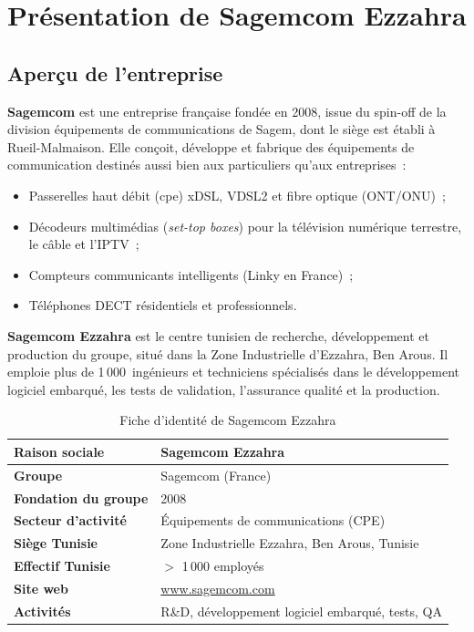 \section{Présentation de Sagemcom Ezzahra}

\subsection{Aperçu de l'entreprise}

\textbf{Sagemcom} est une entreprise française fondée en 2008, issue du
spin-off de la division équipements de communications de Sagem, dont le
siège est établi à Rueil-Malmaison. Elle conçoit, développe et fabrique
des équipements de communication destinés aussi bien aux particuliers
qu'aux entreprises~:

\begin{itemize}
  \item Passerelles haut débit (\gls{cpe}) xDSL, VDSL2 et fibre optique
        (ONT/ONU)~;
  \item Décodeurs multimédias (\textit{set-top boxes}) pour la télévision
        numérique terrestre, le câble et l'IPTV~;
  \item Compteurs communicants intelligents (Linky en France)~;
  \item Téléphones DECT résidentiels et professionnels.
\end{itemize}

\textbf{Sagemcom Ezzahra} est le centre tunisien de recherche, développement
et production du groupe, situé dans la Zone Industrielle d'Ezzahra, Ben
Arous. Il emploie plus de 1\,000~ingénieurs et techniciens spécialisés dans
le développement logiciel embarqué, les tests de validation, l'assurance
qualité et la production.

\begin{table}[H]
  \centering
  \caption{Fiche d'identité de Sagemcom Ezzahra}
  \label{tab:fiche_sagemcom}
  \begin{tabular}{|L{4cm}|L{9cm}|}
    \hline
    \textbf{Raison sociale} & Sagemcom Ezzahra \\
    \hline
    \textbf{Groupe} & Sagemcom (France) \\
    \hline
    \textbf{Fondation du groupe} & 2008 \\
    \hline
    \textbf{Secteur d'activité} & Équipements de communications (CPE) \\
    \hline
    \textbf{Siège Tunisie} & Zone Industrielle Ezzahra, Ben Arous, Tunisie \\
    \hline
    \textbf{Effectif Tunisie} & $>$ 1\,000 employés \\
    \hline
    \textbf{Site web} & \url{www.sagemcom.com} \\
    \hline
    \textbf{Activités} & R\&D, développement logiciel embarqué, tests, QA \\
    \hline
  \end{tabular}
\end{table}

